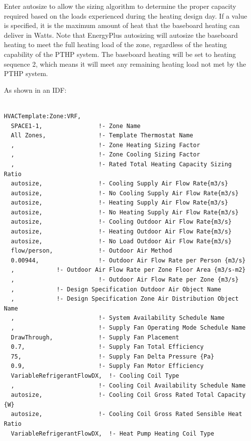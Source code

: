 Enter autosize to allow the sizing algorithm to determine the proper capacity required based on the loads experienced during the heating design day. If a value is specified, it is the maximum amount of heat that the baseboard heating can deliver in Watts. Note that EnergyPlus autosizing will autosize the baseboard heating to meet the full heating load of the zone, regardless of the heating capability of the PTHP system. The baseboard heating will be set to heating sequence 2, which means it will meet any remaining heating load not met by the PTHP system.

As shown in an IDF:

\begin{lstlisting}

HVACTemplate:Zone:VRF,
  SPACE1-1,                !- Zone Name
  All Zones,               !- Template Thermostat Name
  ,                        !- Zone Heating Sizing Factor
  ,                        !- Zone Cooling Sizing Factor
  ,                        !- Rated Total Heating Capacity Sizing Ratio
  autosize,                !- Cooling Supply Air Flow Rate{m3/s}
  autosize,                !- No Cooling Supply Air Flow Rate{m3/s}
  autosize,                !- Heating Supply Air Flow Rate{m3/s}
  autosize,                !- No Heating Supply Air Flow Rate{m3/s}
  autosize,                !- Cooling Outdoor Air Flow Rate{m3/s}
  autosize,                !- Heating Outdoor Air Flow Rate{m3/s}
  autosize,                !- No Load Outdoor Air Flow Rate{m3/s}
  flow/person,             !- Outdoor Air Method
  0.00944,                 !- Outdoor Air Flow Rate per Person {m3/s}
  ,            !- Outdoor Air Flow Rate per Zone Floor Area {m3/s-m2}
  ,                        !- Outdoor Air Flow Rate per Zone {m3/s}
  ,            !- Design Specification Outdoor Air Object Name
  ,            !- Design Specification Zone Air Distribution Object Name
  ,                        !- System Availability Schedule Name
  ,                        !- Supply Fan Operating Mode Schedule Name
  DrawThrough,             !- Supply Fan Placement
  0.7,                     !- Supply Fan Total Efficiency
  75,                      !- Supply Fan Delta Pressure {Pa}
  0.9,                     !- Supply Fan Motor Efficiency
  VariableRefrigerantFlowDX,  !- Cooling Coil Type
  ,                        !- Cooling Coil Availability Schedule Name
  autosize,                !- Cooling Coil Gross Rated Total Capacity {W}
  autosize,                !- Cooling Coil Gross Rated Sensible Heat Ratio
  VariableRefrigerantFlowDX,  !- Heat Pump Heating Coil Type

\end{lstlisting}
